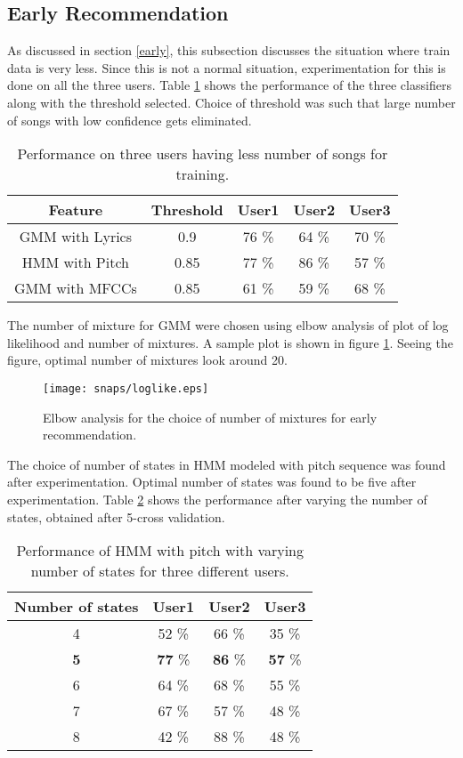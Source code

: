 \subsection{Early Recommendation}
As discussed in section \ref{early}, this subsection discusses the situation where train data is very less. Since this is not a normal situation, experimentation for this is done on all the three users. Table \ref{tab:early} shows the performance of the three classifiers along with the threshold selected. Choice of threshold was such that large number of songs with low confidence gets eliminated.
\begin{table}[!htbp]
\begin{center}
\begin{tabular}{ |c|c|c|c|c| } 
 \hline
  Feature & Threshold & User1 & User2 & User3 \\ \hline
 GMM with Lyrics & 0.9 & 76 \% & 64 \% & 70 \% \\ 
 HMM with Pitch & 0.85 & 77 \% & 86 \%  & 57 \% \\
 GMM with MFCCs & 0.85 & 61 \% & 59 \% & 68 \% \\ \hline
 \end{tabular}
\end{center}
\caption{Performance on three users having less number of songs for training.} \label{tab:early}
\end{table}
\par The number of mixture for GMM were chosen using elbow analysis of plot of log likelihood and number of mixtures. A sample plot is shown in figure \ref{fig:elbow}. Seeing the figure, optimal number of mixtures look around 20.
\begin{figure}[!htpb]
   \begin{center}
	    \texttt{[image: snaps/loglike.eps]}     
     \caption {Elbow analysis for the choice of number of mixtures for early recommendation.}
   \label{fig:elbow}
   \end{center}
 \end{figure}
\par The choice of number of states in HMM modeled with pitch sequence was found after experimentation. Optimal number of states was found to be five after experimentation. Table \ref{tab:hmmproof} shows the performance after varying the number of states, obtained after 5-cross validation.
\begin{table}[!htbp]
\begin{center}
\begin{tabular}{ |c|c|c|c| } 
 \hline
  Number of states  & User1 & User2 & User3 \\ \hline
 4  & 52 \% & 66 \% & 35 \% \\ 
 \textbf{5} & \textbf{77} \% & \textbf{86} \%  & \textbf{57} \% \\
 6 & 64 \% & 68 \% & 55 \% \\ 
7 & 67 \% & 57 \% & 48 \% \\ 
8 & 42 \% & 88 \% & 48 \% \\ \hline
 \end{tabular}
\end{center}
\caption{Performance of HMM with pitch with varying number of states for three different users.} \label{tab:hmmproof}
\end{table}
